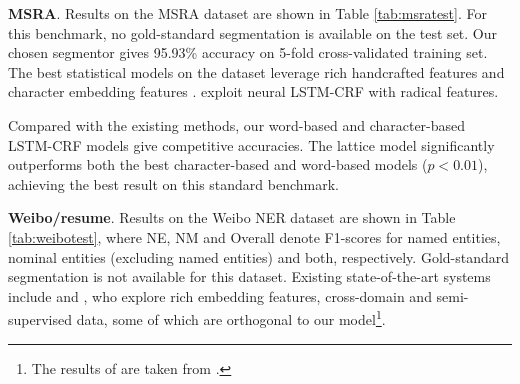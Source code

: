 \documentclass[11pt,a4paper]{article}
\begin{document}
\begin{CJK*}{UTF8}{gbsn}
\begin{table}[!t]
\centering
{}
\caption{Weibo NER results.}
\label{tab:weibotest}
\end{table}


\textbf{MSRA}. Results on the MSRA dataset are shown in Table \ref{tab:msratest}. For this benchmark, no gold-standard segmentation is available on the test set. Our chosen segmentor gives 95.93\% accuracy on 5-fold cross-validated training set. The best statistical models on the dataset leverage rich handcrafted features \cite{chen2006chinese,zhang2006word,zhou2013chinese} and character embedding features \cite{lu2016multi}. \citet{dong2016character} exploit neural LSTM-CRF with radical features. 

Compared with the existing methods, our word-based and character-based LSTM-CRF models give competitive accuracies. The lattice model significantly outperforms both the best character-based and word-based models ($p<0.01$), achieving the best result on this standard benchmark.


\textbf{Weibo/resume}. Results on the Weibo NER dataset are shown in Table \ref{tab:weibotest}, where NE, NM and Overall denote F1-scores for named entities, nominal entities (excluding named entities) and both, respectively. Gold-standard segmentation is not available for this dataset. Existing state-of-the-art systems include \citet{peng2016improving} and \citet{he2017unified}, who explore rich embedding features, cross-domain and semi-supervised data, some of which are orthogonal to our model\footnote{The results of \citet{peng2015named,peng2016improving} are taken from \citet{peng2017supplementary}.}.


\end{CJK*}
\end{document}
